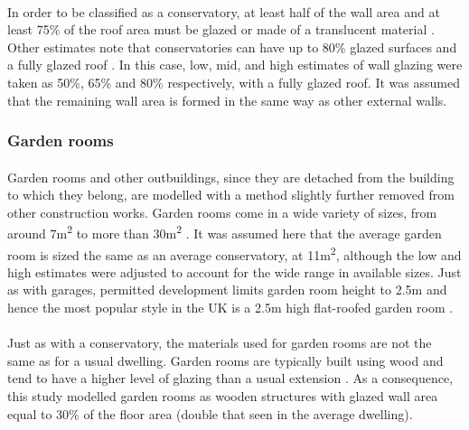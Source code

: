 \documentclass[12pt]{article}
\begin{document}
\paragraph{}
In order to be classified as a conservatory, at least half of the wall area and at least 75\% of the roof area must be glazed or made of a translucent material \citep{ashford_undated-xr}. Other estimates note that conservatories can have up to 80\% glazed surfaces and a fully glazed roof \citep{MyGlazing_undated-ah}. In this case, low, mid, and high estimates of wall glazing were taken as 50\%, 65\% and 80\% respectively, with a fully glazed roof. It was assumed that the remaining wall area is formed in the same way as other external walls.

\subsubsection{Garden rooms}
\label{gardenroom}

\paragraph{}
Garden rooms and other outbuildings, since they are detached from the building to which they belong, are modelled with a method slightly further removed from other construction works. Garden rooms come in a wide variety of sizes, from around 7m\textsuperscript{2} to more than 30m\textsuperscript{2} \citep{apodo_undated-hl}. It was assumed here that the average garden room is sized the same as an average conservatory, at 11m\textsuperscript{2}, although the low and high estimates were adjusted to account for the wide range in available sizes. Just as with garages, permitted development limits garden room height to 2.5m and hence the most popular style in the UK is a 2.5m high flat-roofed garden room \citep{Garden_Room_Guide_2015-is}.

\paragraph{}
Just as with a conservatory, the materials used for garden rooms are not the same as for a usual dwelling. Garden rooms are typically built using wood \citep{Lazy_Susan_2012-ke} and tend to have a higher level of glazing than a usual extension \citep{lomax_undated-od}. As a consequence, this study modelled garden rooms as wooden structures with glazed wall area equal to 30\% of the floor area (double that seen in the average dwelling). 
\end{document}
